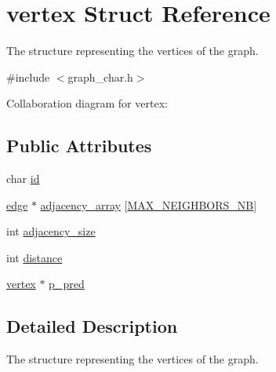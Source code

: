 \hypertarget{structvertex}{\section{vertex Struct Reference}
\label{structvertex}
}


The structure representing the vertices of the graph.  




{\ttfamily \#include $<$graph\-\_\-char.\-h$>$}



Collaboration diagram for vertex\-:
\subsection*{Public Attributes}
\begin{DoxyCompactItemize}
\item 
char \hyperlink{structvertex_a892669c60521d3e785b24f88d03f6537}{id}
\item 
\hyperlink{structedge}{edge} $\ast$ \hyperlink{structvertex_a3f94c351e442c70f9b503ac380ad460a}{adjacency\-\_\-array} \mbox{[}\hyperlink{graph__char_8h_aee9979a47e386d3392d637d35c896114}{M\-A\-X\-\_\-\-N\-E\-I\-G\-H\-B\-O\-R\-S\-\_\-\-N\-B}\mbox{]}
\item 
int \hyperlink{structvertex_abe014b5e3b93b82ba585a6578a3b9ed3}{adjacency\-\_\-size}
\item 
int \hyperlink{structvertex_a60dab6ff86564acea3c8282a1488a4ef}{distance}
\item 
\hyperlink{structvertex}{vertex} $\ast$ \hyperlink{structvertex_a505c7e912c4778ec948558d78cfdda6a}{p\-\_\-pred}
\end{DoxyCompactItemize}


\subsection{Detailed Description}
The structure representing the vertices of the graph. 


